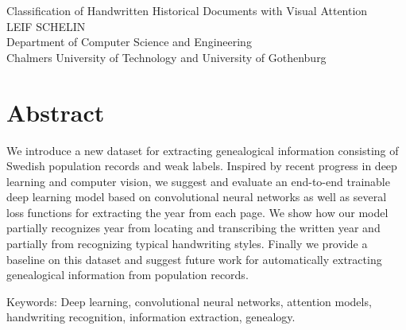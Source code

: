 Classification of Handwritten Historical Documents with Visual Attention \\
LEIF SCHELIN\\
Department of Computer Science and Engineering\\
Chalmers University of Technology and University of Gothenburg\setlength{\parskip}{0.5cm}

\thispagestyle{plain}			%
\section*{Abstract}

We introduce a new dataset for extracting genealogical information consisting of Swedish population records and weak labels.
Inspired by recent progress in deep learning and computer vision, we suggest and evaluate an end-to-end trainable deep learning model based on convolutional neural networks as well as several loss functions for extracting the year from each page.
We show how our model partially recognizes year from locating and transcribing the written year and partially from recognizing typical handwriting styles.
Finally we provide a baseline on this dataset and suggest future work for automatically extracting genealogical information from population records.

\vfill
Keywords: Deep learning, convolutional neural networks, attention models, handwriting recognition, information extraction, genealogy.

\newpage				%
\thispagestyle{empty}
\mbox{}

